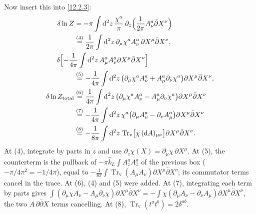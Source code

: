 \begin{tcolorbox}[breakable]
\begin{remark}
		Now insert this into \eqref{12.2.3}:
		\begin{align*}
			\delta\ln Z&=-\pi\int\dif^{2}z\,\frac{\chi^{a}}{\pi}\,\partial_{z}\Bigl(\frac{1}{2\pi}A^{a}_{\nu}\bar\partial X^{\nu}\Bigr)\\
			&\eqs{4} \frac{1}{2\pi}\int\dif^{2}z\,\partial_{\mu}\chi^{a}A^{a}_{\nu}\,\partial X^{\mu}\bar\partial X^{\nu},\\
			&\hspace{-2.5em}\delta\Bigl[-\frac{1}{4\pi}\int\dif^{2}z\,A^{a}_{\mu}A^{a}_{\nu}\partial X^{\mu}\bar\partial X^{\nu}\Bigr]\\
			&\eqs{5} -\frac{1}{4\pi}\int\dif^{2}z\,\bigl(\partial_{\mu}\chi^{a}A^{a}_{\nu}+A^{a}_{\mu}\partial_{\nu}\chi^{a}\bigr)\partial X^{\mu}\bar\partial X^{\nu},\\
			\delta\ln Z_{\text{total}}&\eqs{6} \frac{1}{4\pi}\int\dif^{2}z\,\bigl(\partial_{\mu}\chi^{a}A^{a}_{\nu}-A^{a}_{\mu}\partial_{\nu}\chi^{a}\bigr)\partial X^{\mu}\bar\partial X^{\nu}
			\\&\eqs{7} -\frac{1}{4\pi}\int\dif^{2}z\,\chi^{a}\bigl(\partial_{\mu}A^{a}_{\nu}-\partial_{\nu}A^{a}_{\mu}\bigr)\partial X^{\mu}\bar\partial X^{\nu}\\
			&\eqs{8} -\frac{1}{8\pi}\int\dif^{2}z\,\operatorname{Tr}_{\mathrm v}\bigl[\chi\,(\dif A)_{\mu\nu}\bigr]\partial X^{\mu}\bar\partial X^{\nu} .
		\end{align*}
		At (4), integrate by parts in $z$ and use $\partial_{z}\chi(X)=\partial_{\mu}\chi\,\partial X^{\mu}$. At (5), the counterterm is the pullback of $-\pi\hat k_{L}\int A^{a}_{z}A^{a}_{\bar z}$ of the previous box ($-\pi/4\pi^{2}=-1/4\pi$), equal to $-\frac{1}{8\pi}\int\operatorname{Tr}_{\mathrm v}(A_{\mu}A_{\nu})\partial X^{\mu}\bar\partial X^{\nu}$; its commutator terms cancel in the trace. At (6), (4) and (5) were added. At (7), integrating each term by parts gives $\int(\partial_{\mu}\chi A_{\nu}-A_{\mu}\partial_{\nu}\chi)\partial X^{\mu}\bar\partial X^{\nu}=-\int\chi(\partial_{\mu}A_{\nu}-\partial_{\nu}A_{\mu})\partial X^{\mu}\bar\partial X^{\nu}$, the two $A\,\partial\bar\partial X$ terms cancelling. At (8), $\operatorname{Tr}_{\mathrm v}(t^{a}t^{b})=2\delta^{ab}$.


\end{remark}
\end{tcolorbox}

